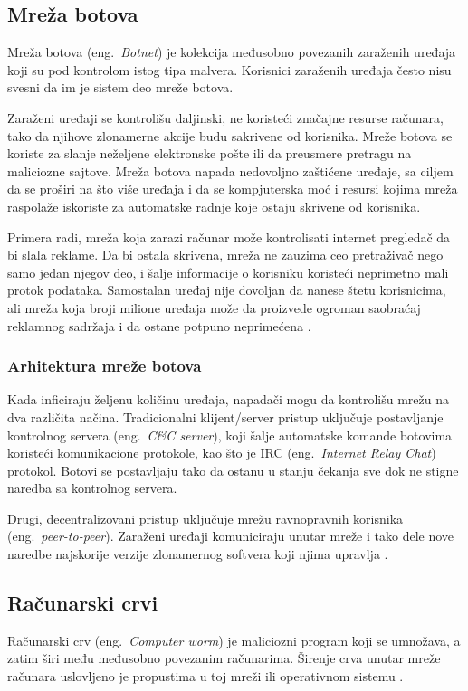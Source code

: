 \documentclass[a4paper]{article}
\begin{document}
\subsection{Mreža botova}

Mreža botova (eng.~{\em Botnet}) je kolekcija 
međusobno povezanih zaraženih uređaja koji su pod kontrolom istog tipa malvera.
Korisnici zaraženih uređaja često nisu svesni da im je sistem deo mreže botova.

Zaraženi uređaji se kontrolišu daljinski, ne koristeći značajne resurse računara, tako da njihove zlonamerne akcije budu sakrivene od korisnika. Mreže botova se koriste za slanje neželjene elektronske pošte ili da preusmere pretragu na maliciozne sajtove. Mreža botova napada nedovoljno zaštićene uređaje, sa ciljem da se proširi na što više uređaja i da se kompjuterska moć i resursi kojima mreža raspolaže iskoriste za automatske radnje koje ostaju skrivene od korisnika.

Primera radi, mreža koja zarazi računar može kontrolisati internet pregledač da bi slala reklame. Da bi ostala skrivena, mreža ne zauzima ceo pretraživač nego samo jedan njegov deo, i šalje informacije o korisniku koristeći neprimetno mali protok podataka. Samostalan uređaj nije dovoljan da nanese štetu korisnicima, ali mreža koja broji milione uređaja može da proizvede ogroman saobraćaj reklamnog sadržaja i da ostane potpuno neprimećena \cite{botnet}.

\subsubsection{Arhitektura mreže botova}

Kada inficiraju željenu količinu uređaja, napadači mogu da kontrolišu mrežu na dva različita načina. Tradicionalni klijent/server pristup uključuje postavljanje kontrolnog servera (eng.~{\em C\&C server}), koji šalje automatske komande botovima koristeći komunikacione protokole, kao što je IRC (eng.~{\em Internet Relay Chat}) protokol. Botovi se postavljaju tako da ostanu u stanju čekanja sve dok ne stigne naredba sa kontrolnog servera.

Drugi, decentralizovani pristup uključuje mrežu ravnopravnih korisnika (eng.~{\em peer-to-peer}).
Zaraženi uređaji komuniciraju unutar mreže i tako dele nove naredbe najskorije verzije zlonamernog softvera koji njima upravlja \cite{botnet}.

\subsection{Računarski crvi}
Računarski crv (eng.~{\em Computer worm}) je maliciozni program koji se umnožava, a zatim širi među međusobno povezanim računarima. Širenje crva unutar mreže računara uslovljeno je propustima u toj mreži ili operativnom sistemu \cite{norton_worm, ethics}.
\end{document}
